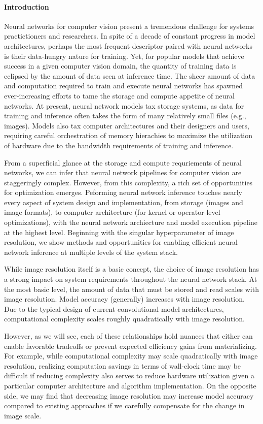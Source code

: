 \paragraph{Introduction}
Neural networks for computer vision present a tremendous challenge for systems practictioners and researchers.
In spite of a decade of constant progress in model architectures, perhaps the most frequent descriptor paired with neural networks is their data-hungry nature for training.
Yet, for popular models that achieve success in a given computer vision domain, the quantity of training data is eclipsed by the amount of data seen at inference time.
The sheer amount of data and computation required to train and execute neural networks has spawned ever-increasing efforts to tame the storage and compute appetite of neural networks.
At present, neural network models tax storage systems, as data for training and inference often takes the form of many relatively small files (e.g., images).
Models also tax computer architectures and their designers and users, requiring careful orchestration of memory hierachies to maximize the utilization of hardware due to the bandwidth requirements of training and inference.

From a superficial glance at the storage and compute requriements of neural networks, we can infer that neural network pipelines for computer vision are staggeringly complex.
However, from this complexity, a rich set of opportunities for optimization emerges.
Peforming neural network inference touches nearly every aspect of system design and implementation, from storage (images and image formats), to computer architecture (for kernel or operator-level optimizations), with the neural network archiecture and model execution pipeline at the highest level.
Beginning with the singular hyperparameter of image resolution, we show methods and opportunities for enabling efficient neural network inference at multiple levels of the system stack.

While image resolution itself is a basic concept, the choice of image resolution has a strong impact on system requirements throughout the neural network stack.
At the most basic level, the amount of data that must be stored and read scales with image resolution.
Model accuracy (generally) increases with image resolution.
Due to the typical design of current convolutional model architectures, computational complexity scales roughly quadratically with image resolution.

However, as we will see, each of these relationships hold nuances that either can enable favorable tradeoffs or prevent expected efficiency gains from materializing.
For example, while computational complexity may scale quadratically with image resolution, realizing computation savings in terms of wall-clock time may be difficult if reducing complexity also serves to reduce hardware utilization given a particular computer architecture and algorithm implementation.
On the opposite side, we may find that decreasing image resolution may increase model accuracy compared to existing approaches if we carefully compensate for the change in image scale.


